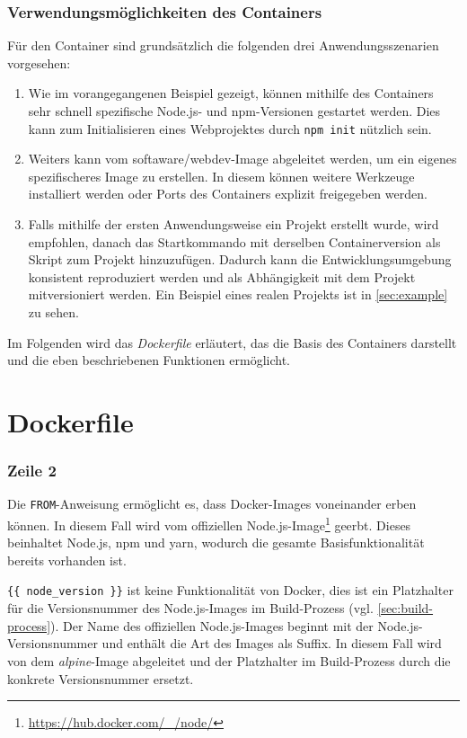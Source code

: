 \subsubsection{Verwendungsmöglichkeiten des Containers}
Für den Container sind grundsätzlich die folgenden drei Anwendungsszenarien vorgesehen:

\begin{enumerate}
    \item Wie im vorangegangenen Beispiel gezeigt, können mithilfe des Containers sehr schnell spezifische Node.js- und npm-Versionen gestartet werden.
        Dies kann \zB zum Initialisieren eines Webprojektes durch \verb|npm init| nützlich sein.
    \item Weiters kann vom softaware/webdev-Image abgeleitet werden, um ein eigenes spezifischeres Image zu erstellen.
        In diesem können \zB weitere Werkzeuge installiert werden oder Ports des Containers explizit freigegeben werden. 
    \item Falls mithilfe der ersten Anwendungsweise ein Projekt erstellt wurde, wird empfohlen, danach das Startkommando mit derselben Containerversion als Skript zum Projekt hinzuzufügen.
        Dadurch kann die Entwicklungsumgebung konsistent reproduziert werden und als Abhängigkeit mit dem Projekt mitversioniert werden.
        Ein Beispiel eines realen Projekts ist in \cref{sec:example} zu sehen.
\end{enumerate}
Im Folgenden wird das \emph{Dockerfile} erläutert, das die Basis des Containers darstellt und die eben beschriebenen Funktionen ermöglicht.

\section{Dockerfile}
\label{sec:dockerfile}


\subsubsection{Zeile 2}
Die \verb|FROM|-Anweisung ermöglicht es, dass Docker-Images voneinander erben können.
In diesem Fall wird vom offiziellen Node.js-Image\footnote{\url{https://hub.docker.com/_/node/}} geerbt.
Dieses beinhaltet Node.js, npm und yarn, wodurch die gesamte Basisfunktionalität bereits vorhanden ist.

\verb|{{ node_version }}| ist keine Funktionalität von Docker, dies ist ein Platzhalter für die Versionsnummer des Node.js-Images im Build-Prozess (vgl. \cref{sec:build-process}).
Der Name des offiziellen Node.js-Images beginnt mit der Node.js-Versionsnummer und enthält die Art des Images als Suffix.
In diesem Fall wird von dem \emph{alpine}-Image abgeleitet und der Platzhalter im Build-Prozess durch die konkrete Versionsnummer ersetzt.

